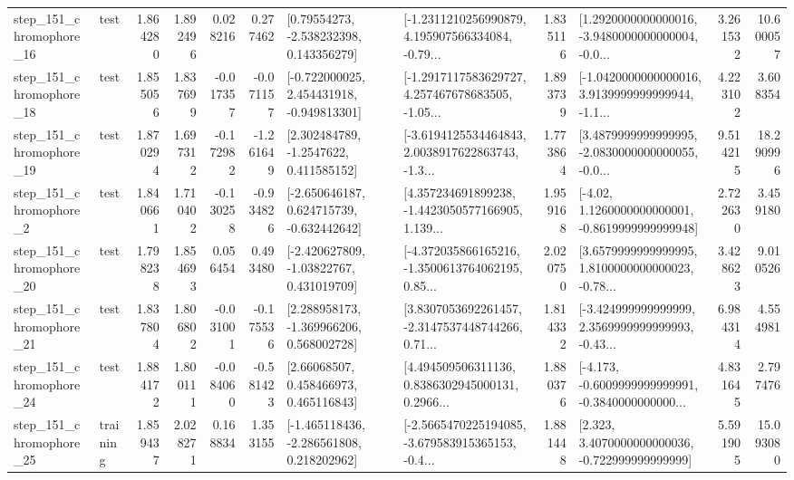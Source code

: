 \begin{tabular}{llrrrrllrlrr}
  step\_151\_chromophore\_16 &      test &      1.864280 &    1.892496 &      0.028216 &  0.277462 &     [0.79554273, -2.538232398, 0.143356279] &  [-1.2311210256990879, 4.195907566334084, -0.79... &       1.835116 &  [1.2920000000000016, -3.9480000000000004, -0.0... &            3.261532 &         10.600057 \\
  step\_151\_chromophore\_18 &      test &      1.855056 &    1.837699 &     -0.017357 & -0.071157 &   [-0.722000025, 2.454431918, -0.949813301] &  [-1.2917117583629727, 4.257467678683505, -1.05... &       1.893739 &  [-1.0420000000000016, 3.9139999999999944, -1.1... &            4.223102 &          3.608354 \\
  step\_151\_chromophore\_19 &      test &      1.870294 &    1.697312 &     -0.172982 & -1.261649 &      [2.302484789, -1.2547622, 0.411585152] &  [-3.6194125534464843, 2.0038917622863743, -1.3... &       1.773864 &  [3.4879999999999995, -2.0830000000000055, -0.0... &            9.514215 &         18.290996 \\
   step\_151\_chromophore\_2 &      test &      1.840661 &    1.710402 &     -0.130258 & -0.934826 &   [-2.650646187, 0.624715739, -0.632442642] &  [4.357234691899238, -1.4423050577166905, 1.139... &       1.959168 &   [-4.02, 1.1260000000000001, -0.8619999999999948] &            2.722630 &          3.459180 \\
  step\_151\_chromophore\_20 &      test &      1.798238 &    1.854693 &      0.056454 &  0.493480 &    [-2.420627809, -1.03822767, 0.431019709] &  [-4.372035866165216, -1.3500613764062195, 0.85... &       2.020750 &  [3.6579999999999995, 1.8100000000000023, -0.78... &            3.428623 &          9.010526 \\
  step\_151\_chromophore\_21 &      test &      1.837804 &    1.806802 &     -0.031001 & -0.175536 &    [2.288958173, -1.369966206, 0.568002728] &  [3.8307053692261457, -2.3147537448744266, 0.71... &       1.814332 &  [-3.424999999999999, 2.3569999999999993, -0.43... &            6.984314 &          4.554981 \\
  step\_151\_chromophore\_24 &      test &      1.884172 &    1.800111 &     -0.084060 & -0.581423 &      [2.66068507, 0.458466973, 0.465116843] &  [4.494509506311136, 0.8386302945000131, 0.2966... &       1.880376 &  [-4.173, -0.6009999999999991, -0.3840000000000... &            4.831645 &          2.797476 \\
  step\_151\_chromophore\_25 &  training &      1.859437 &    2.028271 &      0.168834 &  1.353155 &   [-1.465118436, -2.286561808, 0.218202962] &  [-2.5665470225194085, -3.679583915365153, -0.4... &       1.881448 &    [2.323, 3.4070000000000036, -0.722999999999999] &            5.591905 &         15.093080 \\

\end{tabular}
